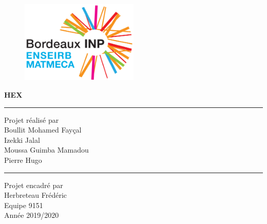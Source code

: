 \documentclass[a4paper,12pt]{article}
\begin{document}
\begin{figure}
    \centering
    \includegraphics[width=0.5\textwidth]{enseirb-matmeca.png}
\end{figure}

\begin{center}
\vspace{0.5\baselineskip}
  \Huge
  { \huge \bfseries HEX}\\[0.4cm]
\vspace{\baselineskip}
\large
\begin{center}
 \rule{0.5\linewidth}{1pt}
 \end{center}
 
Projet réalisé par \\
\large
\vspace{1\baselineskip}
Boullit Mohamed Fayçal\\
Izekki Jalal\\
Moussa Guimba Mamadou\\
Pierre Hugo\\
\begin{center}
 \rule{0.5\linewidth}{1pt}
 \end{center}
\vspace{2\baselineskip}
\large
Projet encadré par \\
\vspace{1\baselineskip}
Herbreteau Frédéric\\
\large
\vspace{3\baselineskip}
Equipe 9151\\
\vspace{3\baselineskip}
Année 2019/2020
\end{center}
\newpage

\tableofcontents
\newpage







\end{document}
